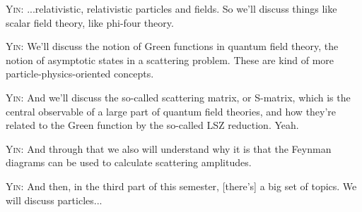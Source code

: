 \noindent\textsc{Yin:} ...relativistic, relativistic particles and fields. So we'll discuss things like scalar field theory, like phi-four theory.\par

\noindent\textsc{Yin:} We'll discuss the notion of Green functions in quantum field theory, the notion of asymptotic states in a scattering problem. These are kind of more particle-physics-oriented concepts.\par

\noindent\textsc{Yin:} And we'll discuss the so-called scattering matrix, or S-matrix, which is the central observable of a large part of quantum field theories, and how they're related to the Green function by the so-called LSZ reduction. Yeah.\par

\noindent\textsc{Yin:} And through that we also will understand why it is that the Feynman diagrams can be used to calculate scattering amplitudes.\par


\noindent\textsc{Yin:} And then, in the third part of this semester, [there's] a big set of topics. We will discuss particles...\par


